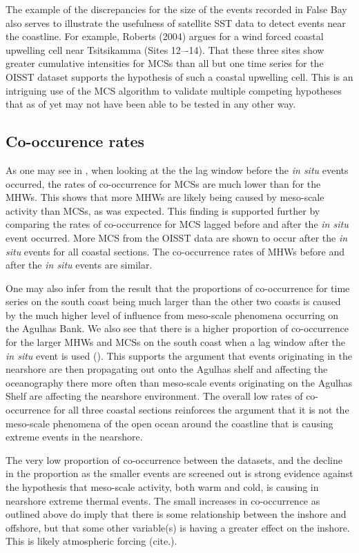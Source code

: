 \documentclass[a4paper,10pt,review]{elsarticle}
\begin{document}
The example of the discrepancies for the size of the events recorded in False Bay also serves to illustrate the usefulness of satellite SST data to detect events near the coastline. For example, Roberts (2004) argues for a wind forced coastal upwelling cell near Tsitsikamma (Sites 12–-14). That these three sites show greater cumulative intensities for MCSs than all but one time series for the OISST dataset supports the hypothesis of such a coastal upwelling cell. This is an intriguing use of the MCS algorithm to validate multiple competing hypotheses that as of yet may not have been able to be tested in any other way. 

\subsection{Co-occurence rates}
As one may see in , when looking at the the lag window before the \emph{in situ} events occurred, the rates of co-occurrence for MCSs are much lower than for the MHWs. This shows that more MHWs are likely being caused by meso-scale activity than MCSs, as was expected. This finding is supported further by comparing the rates of co-occurrence for MCS lagged before and after the \emph{in situ} event occurred. More MCS from the OISST data are shown to occur after the \emph{in situ} events for all coastal sections. The co-occurrence rates of MHWs before and after the \emph{in situ} events are similar.

One may also infer from the result that the proportions of co-occurrence for time series on the south coast being much larger than the other two coasts is caused by the much higher level of influence from meso-scale phenomena occurring on the Agulhas Bank. We also see that there is a higher proportion of co-occurrence for the larger MHWs and MCSs on the south coast when a lag window after the \emph{in situ} event is used (). This supports the argument that events originating in the nearshore are then propagating out onto the Agulhas shelf and affecting the oceanography there more often than meso-scale events originating on the Agulhas Shelf are affecting the nearshore environment. The overall low rates of co-occurrence for all three coastal sections reinforces the argument that it is not the meso-scale phenomena of the open ocean around the coastline that is causing extreme events in the nearshore.

The very low proportion of co-occurrence between the datasets, and the decline in the proportion as the smaller events are screened out is strong evidence against the hypothesis that meso-scale activity, both warm and cold, is causing in nearshore extreme thermal events. The small increases in co-occurrence as outlined above do imply that there is some relationship between the inshore and offshore, but that some other variable(s) is having a greater effect on the inshore. This is likely atmospheric forcing (cite.).
\end{document}
